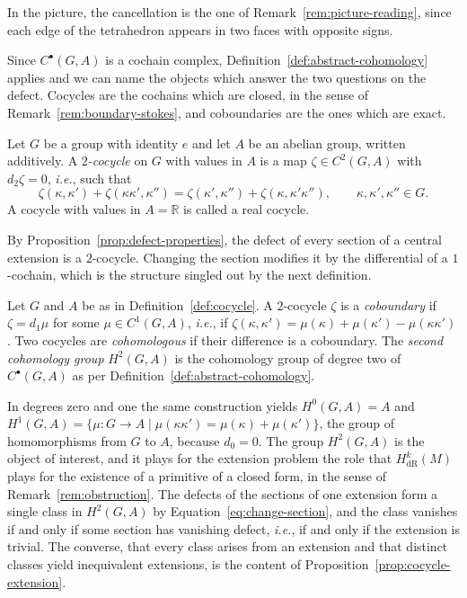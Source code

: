 \noindent In the picture, the cancellation is the one of Remark~\ref{rem:picture-reading}, since each edge of the tetrahedron appears in two faces with opposite signs.

Since $C^\bullet(G,A)$ is a cochain complex, Definition~\ref{def:abstract-cohomology} applies and we can name the objects which answer the two questions on the defect. Cocycles are the cochains which are closed, in the sense of Remark~\ref{rem:boundary-stokes}, and coboundaries are the ones which are exact.

\begin{definition}[Cocycle]\label{def:cocycle}
	Let $G$ be a group with identity $e$ and let $A$ be an abelian group, written additively. A \emph{$2$-cocycle} on $G$ with values in $A$ is a map $\zeta\in C^2(G,A)$ with $d_2\zeta=0$, \textit{i.e.}, such that
	\begin{equation*}
		\zeta(\kappa,\kappa')+\zeta(\kappa\kappa',\kappa'')=\zeta(\kappa',\kappa'')+\zeta(\kappa,\kappa'\kappa''), \qquad \kappa,\kappa',\kappa''\in G.
	\end{equation*}
	A cocycle with values in $A=\mathbb{R}$ is called a real cocycle.
\end{definition}

By Proposition~\ref{prop:defect-properties}, the defect of every section of a central extension is a $2$-cocycle. Changing the section modifies it by the differential of a $1$-cochain, which is the structure singled out by the next definition.

\begin{definition}\label{def:cohomology-group}
	Let $G$ and $A$ be as in Definition~\ref{def:cocycle}. A $2$-cocycle $\zeta$ is a \emph{coboundary} if $\zeta=d_1\mu$ for some $\mu\in C^1(G,A)$, \textit{i.e.}, if $\zeta(\kappa,\kappa')=\mu(\kappa)+\mu(\kappa')-\mu(\kappa\kappa')$. Two cocycles are \emph{cohomologous} if their difference is a coboundary. The \emph{second cohomology group} $H^2(G,A)$ is the cohomology group of degree two of $C^\bullet(G,A)$ as per Definition~\ref{def:abstract-cohomology}.
\end{definition}

In degrees zero and one the same construction yields $H^0(G,A)=A$ and $H^1(G,A)=\{\mu:G\to A\mid\mu(\kappa\kappa')=\mu(\kappa)+\mu(\kappa')\}$, the group of homomorphisms from $G$ to $A$, because $d_0=0$. The group $H^2(G,A)$ is the object of interest, and it plays for the extension problem the role that $H^k_{\mathrm{dR}}(M)$ plays for the existence of a primitive of a closed form, in the sense of Remark~\ref{rem:obstruction}. The defects of the sections of one extension form a single class in $H^2(G,A)$ by Equation~\eqref{eq:change-section}, and the class vanishes if and only if some section has vanishing defect, \textit{i.e.}, if and only if the extension is trivial. The converse, that every class arises from an extension and that distinct classes yield inequivalent extensions, is the content of Proposition~\ref{prop:cocycle-extension}.

